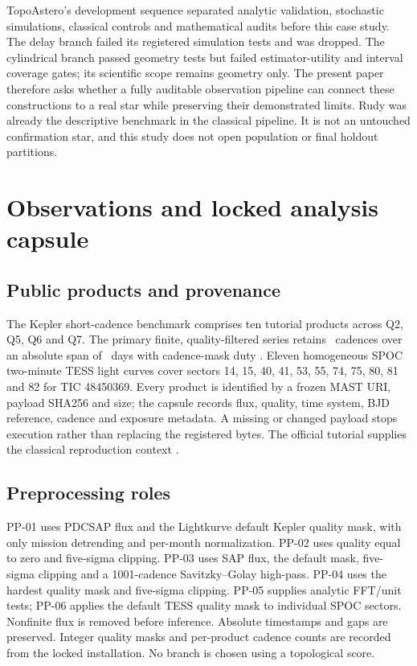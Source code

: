 \documentclass[11pt]{article}
\begin{document}
TopoAstero's development sequence separated analytic validation, stochastic
simulations, classical controls and mathematical audits before this case study.
The delay branch failed its registered simulation tests and was dropped. The
cylindrical branch passed geometry tests but failed estimator-utility and interval
coverage gates; its scientific scope remains geometry only. The present paper
therefore asks whether a fully auditable observation pipeline can connect these
constructions to a real star while preserving their demonstrated limits.
Rudy was already the descriptive benchmark in the classical pipeline. It is not
an untouched confirmation star, and this study does not open population or final
holdout partitions.

\section{Observations and locked analysis capsule}
\subsection{Public products and provenance}
The Kepler short-cadence benchmark comprises ten tutorial products across Q2,
Q5, Q6 and Q7. The primary finite, quality-filtered series retains
\RudyCadences\ cadences over an absolute span of \RudyBaseline\ days with
cadence-mask duty \RudyDuty. Eleven homogeneous SPOC two-minute TESS light curves
cover sectors 14, 15, 40, 41, 53, 55, 74, 75, 80, 81 and 82 for TIC 48450369.
Every product is identified by a frozen MAST URI, payload SHA256 and size; the
capsule records flux, quality, time system, BJD reference, cadence and exposure
metadata. A missing or changed payload stops execution rather than replacing
the registered bytes. The official tutorial supplies the classical reproduction
context \citep{LightkurveTutorial,Lightkurve2018,MAST2026}.

\subsection{Preprocessing roles}
PP-01 uses PDCSAP flux and the Lightkurve default Kepler quality mask, with only
mission detrending and per-month normalization. PP-02 uses quality equal to zero
and five-sigma clipping. PP-03 uses SAP flux, the default mask, five-sigma clipping
and a 1001-cadence Savitzky--Golay high-pass. PP-04 uses the hardest quality mask
and five-sigma clipping. PP-05 supplies analytic FFT/unit tests; PP-06 applies the
default TESS quality mask to individual SPOC sectors. Nonfinite flux is removed
before inference. Absolute timestamps and gaps are preserved. Integer quality
masks and per-product cadence counts are recorded from the locked installation.
No branch is chosen using a topological score.
\end{document}
